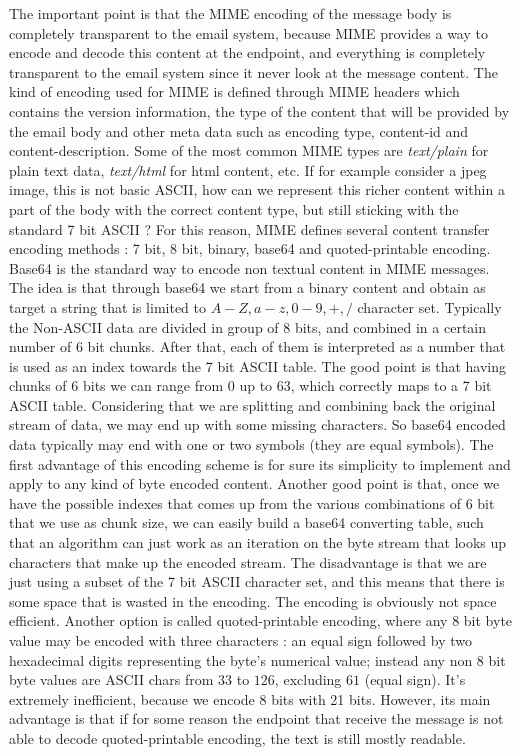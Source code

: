 The important point is that the MIME encoding of the message body is completely transparent to the email system, because MIME provides a way to encode and decode this content at the endpoint, and everything is completely transparent to the email system since it never look at the message content. The kind of encoding used for MIME is defined through MIME headers which contains the version information, the type of the content that will be provided by the email body and other meta data such as encoding type, content-id and content-description. Some of the most common MIME types are \textit{text/plain} for plain text data, \textit{text/html} for html content, etc. If for example consider a jpeg image, this is not basic ASCII, how can we represent this richer content within a part of the body with the correct content type, but still sticking with the standard 7 bit ASCII ? For this reason, MIME defines several content transfer encoding methods : 7 bit, 8 bit, binary, base64 and quoted-printable encoding. Base64 is the standard way to encode non textual content in MIME messages. The idea is that through base64 we start from a binary content and obtain as target a string that is limited to $A-Z, a-z, 0-9,+, /$ character set. Typically the Non-ASCII data are divided in group of 8 bits, and combined in a certain number of 6 bit chunks. After that, each of them is interpreted as a number that is used as an index towards the 7 bit ASCII table. The good point is that having chunks of 6 bits we can range from $0$ up to $63$, which correctly maps to a 7 bit ASCII table. Considering that we are splitting and combining back the original stream of data, we may end up with some missing characters. So base64 encoded data typically may end with one or two symbols (they are equal symbols). The first advantage of this encoding scheme is for sure its simplicity to implement and apply to any kind of byte encoded content. Another good point is that, once we have the possible indexes that comes up from the various combinations of 6 bit that we use as chunk size, we can easily build a base64 converting table, such that an algorithm can just work as an iteration on the byte stream that looks up characters that make up the encoded stream. The disadvantage is that we are just using a subset of the 7 bit ASCII character set, and this means that there is some space that is wasted in the encoding. The encoding is obviously not space efficient. Another option is called quoted-printable encoding, where any 8 bit byte value may be encoded with three characters : an equal sign followed by two hexadecimal digits representing the byte's numerical value; instead any non 8 bit byte values are ASCII chars from $33$ to $126$, excluding $61$ (equal sign). It's extremely inefficient, because we encode 8 bits with 21 bits. However, its main advantage is that if for some reason the endpoint that receive the message is not able to decode quoted-printable encoding, the text is still mostly readable.
